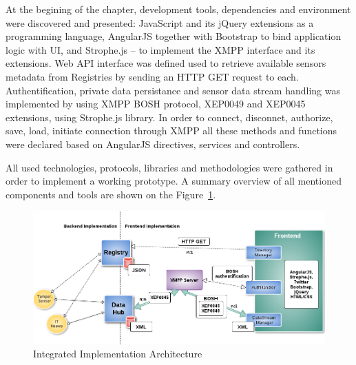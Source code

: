 At the begining of the chapter, development tools, dependencies and environment were discovered and presented: JavaScript and its jQuery extensions as a programming language, AngularJS together with Bootstrap to bind application logic with UI, and Strophe.js -- to implement the XMPP interface and its extensions. Web API interface was defined used to retrieve available sensors metadata from Registries by sending an HTTP GET request to each. Authentification, private data persistance and sensor data stream handling was implemented by using XMPP BOSH protocol, XEP0049 and XEP0045 extensions, using Strophe.js library. In order to connect, disconnet, authorize, save, load, initiate connection through XMPP all these methods and functions were declared based on AngularJS directives, services and controllers.

All used technologies, protocols, libraries and methodologies were gathered in order to implement a working prototype. A summary overview of all mentioned components and tools are shown on the Figure~\ref{img:summary}.

\begin{figure}[H]
\centering
\includegraphics[scale=0.5]{images/ch5Summary.png}   
\caption[Implementation Architecture]{Integrated Implementation Architecture}  
\label{img:summary}                       
\end{figure}

